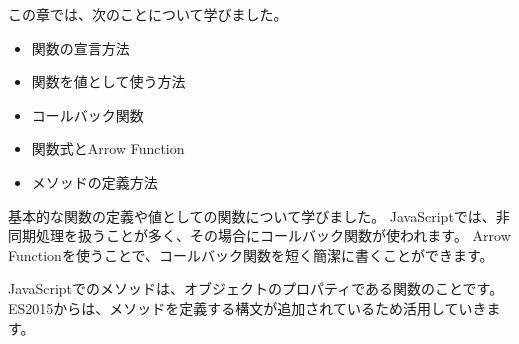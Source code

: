この章では、次のことについて学びました。

\begin{itemize}
\item
  関数の宣言方法
\item
  関数を値として使う方法
\item
  コールバック関数
\item
  関数式とArrow Function
\item
  メソッドの定義方法
\end{itemize}

基本的な関数の定義や値としての関数について学びました。
JavaScriptでは、非同期処理を扱うことが多く、その場合にコールバック関数が使われます。
Arrow
Functionを使うことで、コールバック関数を短く簡潔に書くことができます。

JavaScriptでのメソッドは、オブジェクトのプロパティである関数のことです。
ES2015からは、メソッドを定義する構文が追加されているため活用していきます。
